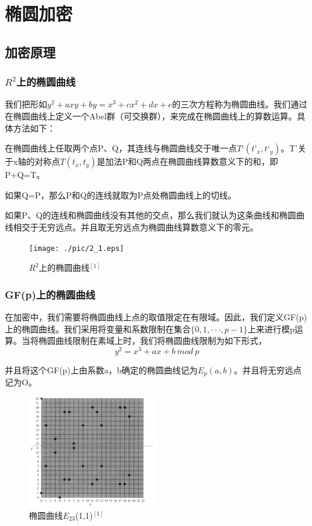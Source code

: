 \section{椭圆加密}

\subsection{加密原理}

\subsubsection{$R^2$上的椭圆曲线}

我们把形如$y^2+axy+by=x^3+cx^2+dx+e$的三次方程称为椭圆曲线。我们通过在椭圆曲线上定义一个Abel群（可交换群），来完成在椭圆曲线上的算数运算。具体方法如下：

在椭圆曲线上任取两个点P、Q，其连线与椭圆曲线交于唯一点$T‘(t’_x,t‘_y)$。T'关于x轴的对称点$T(t_x,t_y)$是加法P和Q两点在椭圆曲线算数意义下的和，即P+Q=T。

如果Q=P，那么P和Q的连线就取为P点处椭圆曲线上的切线。

如果P、Q的连线和椭圆曲线没有其他的交点，那么我们就认为这条曲线和椭圆曲线相交于无穷远点。并且取无穷远点为椭圆曲线算数意义下的零元。

\begin{figure}[h]
	\centering
		\texttt{[image: ./pic/2\_1.eps]}
	\caption{$R^2$上的椭圆曲线$^{[1]}$}
\end{figure}

\subsubsection{GF(p)上的椭圆曲线}

在加密中，我们需要将椭圆曲线上点的取值限定在有限域。因此，我们定义GF(p)上的椭圆曲线。我们采用将变量和系数限制在集合$\{0,1,\cdot\cdot\cdot,p-1\}$上来进行模p运算。当将椭圆曲线限制在素域上时，我们将椭圆曲线限制为如下形式，
\begin{equation*}
y^2=x^3+ax+b\ mod\ p
\end{equation*}

并且将这个GF(p)上由系数a，b确定的椭圆曲线记为$E_p(a,b)$。并且将无穷远点记为O。

\begin{figure}[h]
	\centering
		\includegraphics[width=0.5\textwidth]{./pic/2_2.eps}
	\caption{椭圆曲线$E_{23}$(1,1)$^{[1]}$}
\end{figure}

